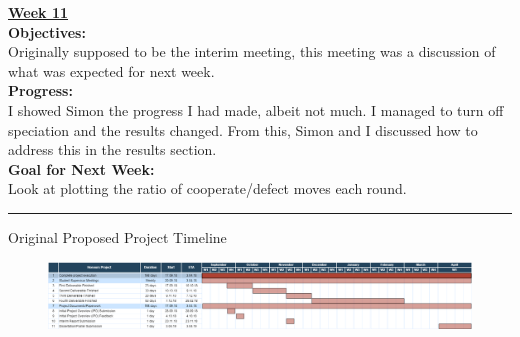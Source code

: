 \documentclass[12pt,a4paper]{article}
\makeatletter
\renewcommand\section{\@startsection {section}{1}{0mm}
                               {4pt plus 2pt minus 1pt}
                               {4pt plus 0pt}
                               {\bfseries}}
\makeatother
\begin{document}
\begin{appendices}
\textbf{\underline{Week 11}} \\
\newline
\textbf{Objectives:} \\
Originally supposed to be the interim meeting, this meeting was a discussion of what was expected for next week. \\

\textbf{Progress:} \\
I showed Simon the progress I had made, albeit not much. I managed to turn off speciation and the results changed. From this, Simon and I discussed how to address this in the results section. \\

\textbf{Goal for Next Week:} \\
Look at plotting the ratio of cooperate/defect moves each round. \\

\hrule

\newpage
\section{Original Proposed Project Timeline}

\begin{figure}[H]
	\centering
		\includegraphics[width=1.5\textwidth,height=\textheight,keepaspectratio, angle=90,origin=c]{HonoursTimeline}
\end{figure}

\end{appendices}
\end{document}
